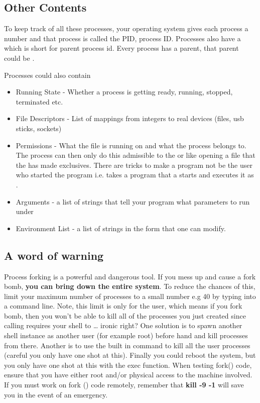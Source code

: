 \subsection{Other Contents}

To keep track of all these processes, your operating system gives each process a number and that process is called the PID, process ID. Processes also have a  which is short for parent process id. Every process has a parent, that parent could be .

Processes could also contain 
\begin{itemize}
\item Running State - Whether a process is getting ready, running, stopped, terminated etc. 
\item File Descriptors - List of mappings from integers to real devices (files, usb sticks, sockets) 
\item Permissions - What  the file is running on and what  the process belongs to. The process can then only do this admissible to the  or  like opening a file that the  has made exclusives. There are tricks to make a program not be the user who started the program i.e.  takes a program that a  starts and executes it as . 
\item Arguments - a list of strings that tell your program what parameters to run under
\item Environment List - a list of strings in the form  that one can modify.
\end{itemize}

\subsection{A word of warning}

Process forking is a powerful and dangerous tool. If you mess up and cause a fork bomb, \textbf{you can bring down the entire system}. To reduce the chances of this, limit your maximum number of processes to a small number e.g 40 by typing  into a command line. Note, this limit is only for the user, which means if you fork bomb, then you won't be able to kill all of the processes you just created since calling  requires your shell to  \ldots{} ironic right? One solution is to spawn another shell instance as another user (for example root) before hand and kill processes from there. Another is to use the built in  command to kill all the user processes (careful you only have one shot at this). Finally you could reboot the system, but you only have one shot at this with the exec function. When testing fork() code, ensure that you have either root and/or physical access to the machine involved. If you must work on fork () code remotely, remember that \textbf{kill -9 -1} will save you in the event of an emergency.

